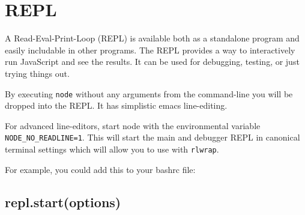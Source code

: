 \section{REPL}\label{repl}

\begin{Shaded}
\begin{Highlighting}[]
 
\end{Highlighting}
\end{Shaded}

A Read-Eval-Print-Loop (REPL) is available both as a standalone program
and easily includable in other programs. The REPL provides a way to
interactively run JavaScript and see the results. It can be used for
debugging, testing, or just trying things out.

By executing \texttt{node} without any arguments from the command-line
you will be dropped into the REPL. It has simplistic emacs line-editing.

\begin{Shaded}
\begin{Highlighting}[]
  
\NormalTok{> a = [ }\NormalTok{, }\NormalTok{, }\NormalTok{];}
\NormalTok{[ }\NormalTok{, }\NormalTok{, } \NormalTok{]}
\NormalTok{> }\NormalTok{(} 
\end{Highlighting}
\end{Shaded}

For advanced line-editors, start node with the environmental variable
\texttt{NODE\_NO\_READLINE=1}. This will start the main and debugger
REPL in canonical terminal settings which will allow you to use with
\texttt{rlwrap}.

For example, you could add this to your bashrc file:

\begin{Shaded}
\begin{Highlighting}[]
\end{Highlighting}
\end{Shaded}

\subsection{repl.start(options)}\label{repl.startoptions}

